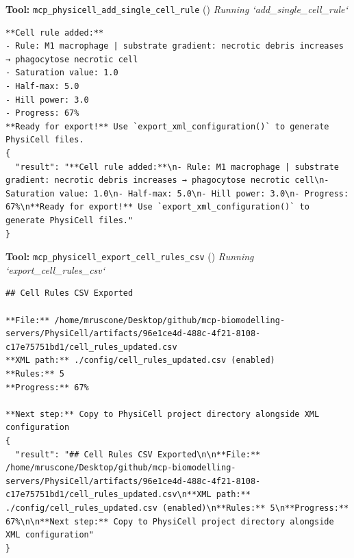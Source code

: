 \documentclass[11pt,a4paper]{article}
\begin{document}
\begin{toolokbox}
\textbf{Tool:} \texttt{mcp\_physicell\_add\_single\_cell\_rule} (\checkmark)
\textit{Running `add\_single\_cell\_rule`}
\begin{lstlisting}
**Cell rule added:**
- Rule: M1 macrophage | substrate gradient: necrotic debris increases → phagocytose necrotic cell
- Saturation value: 1.0
- Half-max: 5.0
- Hill power: 3.0
- Progress: 67%
**Ready for export!** Use `export_xml_configuration()` to generate PhysiCell files.
{
  "result": "**Cell rule added:**\n- Rule: M1 macrophage | substrate gradient: necrotic debris increases → phagocytose necrotic cell\n- Saturation value: 1.0\n- Half-max: 5.0\n- Hill power: 3.0\n- Progress: 67%\n**Ready for export!** Use `export_xml_configuration()` to generate PhysiCell files."
}
\end{lstlisting}
\end{toolokbox}
\begin{toolokbox}
\textbf{Tool:} \texttt{mcp\_physicell\_export\_cell\_rules\_csv} (\checkmark)
\textit{Running `export\_cell\_rules\_csv`}
\begin{lstlisting}
## Cell Rules CSV Exported

**File:** /home/mruscone/Desktop/github/mcp-biomodelling-servers/PhysiCell/artifacts/96e1ce4d-488c-4f21-8108-c17e75751bd1/cell_rules_updated.csv
**XML path:** ./config/cell_rules_updated.csv (enabled)
**Rules:** 5
**Progress:** 67%

**Next step:** Copy to PhysiCell project directory alongside XML configuration
{
  "result": "## Cell Rules CSV Exported\n\n**File:** /home/mruscone/Desktop/github/mcp-biomodelling-servers/PhysiCell/artifacts/96e1ce4d-488c-4f21-8108-c17e75751bd1/cell_rules_updated.csv\n**XML path:** ./config/cell_rules_updated.csv (enabled)\n**Rules:** 5\n**Progress:** 67%\n\n**Next step:** Copy to PhysiCell project directory alongside XML configuration"
}
\end{lstlisting}
\end{toolokbox}
\end{document}
